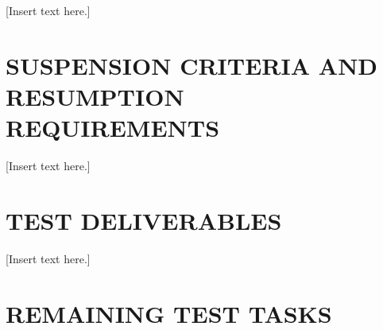 \documentclass[twoside,letterpaper]{article}
\begin{document}
[Insert text here.]


\section[SUSPENSION CRITERIA]
{\bfseries SUSPENSION CRITERIA AND RESUMPTION 
\\REQUIREMENTS}

[Insert text here.]

\section[TEST DELIVERABLES]
{\bfseries TEST DELIVERABLES}

[Insert text here.]

\section[REMAINING TEST TASKS]{\bfseries REMAINING TEST TASKS}

\end{document}
